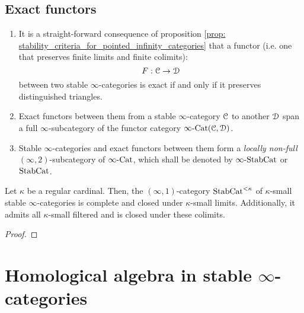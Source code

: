         \subsection{Exact functors}
            \begin{remark} \label{remark: functors_between_stable_infinity_categories}  
                
                \begin{enumerate}
                    \item It is a straight-forward consequence of proposition \ref{prop: stability_criteria_for_pointed_infinity_categories} that a functor (i.e. one that preserves finite limits and finite colimits):
                        $$F: \mathcal{C} \to \mathcal{D}$$
                    between two stable $\infty$-categories is exact if and only if it preserves distinguished triangles.
                    \item Exact functors between them from a stable $\infty$-category $\mathcal{C}$ to another $\mathcal{D}$ span a full $\infty$-subcategory of the functor category $\infty\text{-}\mathrm{Cat}(\mathcal{C}, \mathcal{D})$.
                    \item Stable $\infty$-categories and exact functors between them form a \textit{locally non-full} $(\infty, 2)$-subcategory of $\infty\text{-}\mathrm{Cat}$, which shall be denoted by $\infty\text{-}\mathrm{Stab}\mathrm{Cat}$ or $\mathrm{Stab}\mathrm{Cat}$. 
                \end{enumerate}
            \end{remark}
            
            \begin{proposition} \label{prop: (co)limits_of_stable_infinity_categories}  
                Let $\kappa$ be a regular cardinal. Then, the $(\infty, 1)$-category $\mathrm{Stab}\mathrm{Cat}^{< \kappa}$ of $\kappa$-small stable $\infty$-categories is complete and closed under $\kappa$-small limits. Additionally, it admits all $\kappa$-small filtered and is closed under these colimits. 
            \end{proposition}
                \begin{proof}
                    
                \end{proof}
    
    \section{Homological algebra in stable \texorpdfstring{$\infty$}{}-categories}
